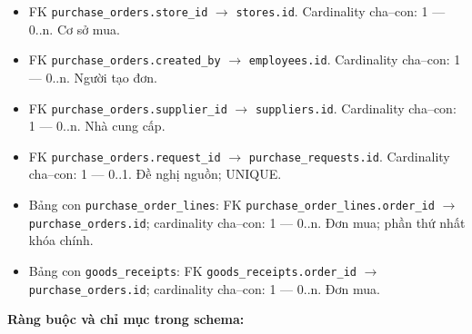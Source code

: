 \begin{itemize}

\item FK \texttt{purchase\_orders.store\_id} $\rightarrow$ \texttt{stores.id}. Cardinality cha--con: 1 — 0..n. Cơ sở mua.

\item FK \texttt{purchase\_orders.created\_by} $\rightarrow$ \texttt{employees.id}. Cardinality cha--con: 1 — 0..n. Người tạo đơn.

\item FK \texttt{purchase\_orders.supplier\_id} $\rightarrow$ \texttt{suppliers.id}. Cardinality cha--con: 1 — 0..n. Nhà cung cấp.

\item FK \texttt{purchase\_orders.request\_id} $\rightarrow$ \texttt{purchase\_requests.id}. Cardinality cha--con: 1 — 0..1. Đề nghị nguồn; UNIQUE.

\item Bảng con \texttt{purchase\_order\_lines}: FK \texttt{purchase\_order\_lines.order\_id} $\rightarrow$ \texttt{purchase\_orders.id}; cardinality cha--con: 1 — 0..n. Đơn mua; phần thứ nhất khóa chính.

\item Bảng con \texttt{goods\_receipts}: FK \texttt{goods\_receipts.order\_id} $\rightarrow$ \texttt{purchase\_orders.id}; cardinality cha--con: 1 — 0..n. Đơn mua.

\end{itemize}

\textbf{Ràng buộc và chỉ mục trong schema:}

